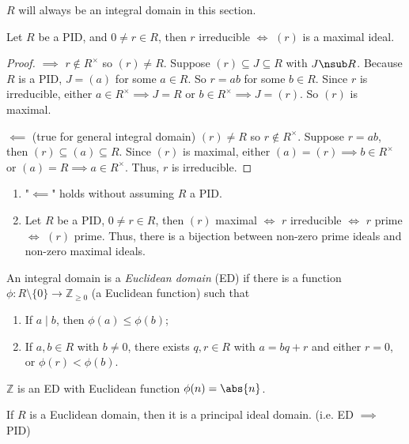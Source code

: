 \(R\) will always be an integral domain in this section.
\begin{lemma}{}{}
    Let \(R\) be a PID, and \(0 \neq r \in R\), then \(r\) irreducible \(\iff \) \((r)\) is a maximal ideal.
\end{lemma}
\begin{proof}
    \(\implies\) \(r\notin R^\times\) so \((r) \neq R\). Suppose \((r) \subseteq J \subseteq R\) with \(J \nsub R\). Because \(R\) is a PID, \(J = (a)\) for some \(a \in R\). So \(r = ab\) for some \(b \in R\). Since \(r\) is irreducible, either \(a \in R^\times \implies J = R\) or \(b \in R^\times \implies J = (r)\). So \((r)\) is maximal.

    \(\impliedby\) (true for general integral domain) \((r) \neq R\) so \(r \notin R^\times \). Suppose \(r = ab\), then \((r) \subseteq (a) \subseteq R\). Since \((r)\) is maximal, either \((a) = (r) \implies b \in R^\times\) or \((a) = R \implies a \in R^\times\). Thus, \(r\) is irreducible.
\end{proof}
\begin{remark}
    \leavevmode
    \begin{enumerate}
        \item "\(\impliedby\)" holds without assuming \(R\) a PID.
        \item Let \(R\) be a PID, \(0 \neq r \in R\), then \((r)\) maximal \(\iff \) \(r\) irreducible \(\iff \) \(r\) prime \(\iff \) \((r)\) prime. Thus, there is a bijection between non-zero prime ideals and non-zero maximal ideals.
    \end{enumerate}
\end{remark}
\begin{definition}{}{}
    An integral domain is a \textit{Euclidean domain} (ED) if there is a function \(\phi:R\setminus \{0\} \to \mathbb{Z}_{\geq 0}\) (a Euclidean function) such that
    \begin{enumerate}
        \item If \(a\mid b\), then \(\phi(a) \leq \phi(b)\);
        \item If \(a,b \in R\) with \(b \neq 0\), there exists \(q, r \in R\) with \(a = bq + r\) and either \(r = 0\), or \(\phi(r) < \phi(b)\).
    \end{enumerate}
\end{definition}
\begin{example}
    \(\mathbb{Z}\) is an ED with Euclidean function \(\phi(n) = \abs{n}\).
\end{example}
\begin{proposition}{}{}
    If \(R\) is a Euclidean domain, then it is a principal ideal domain. (i.e. ED \(\implies\) PID)
\end{proposition}
